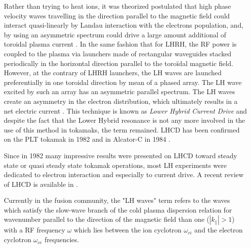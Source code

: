 Rather than trying to heat ions, it was theorized postulated that high phase velocity waves travelling in the direction parallel to the magnetic field could interact quasi-linearly by Landau interaction with the electrons population, and, by using an asymmetric spectrum could drive a large amount additional of toroidal plasma current . In the same fashion that for LHRH, the RF power is coupled to the plasma via launchers made of rectangular waveguides stacked periodically in the horizontal direction parallel to the toroïdal magnetic field. However, at the contrary of LHRH launchers, the LH waves are launched preferentially in one toroidal direction by mean of a phased array. The LH wave excited by such an array has an asymmetric parallel spectrum. The LH waves create an asymmetry in the electron distribution, which ultimately results in a net electric current . This technique is known as \emph{Lower Hybrid Current Drive} and despite the fact that the Lower Hybrid resonance is not any more involved in the use of this method in tokamaks, the term remained. LHCD has been confirmed on the PLT tokamak in 1982  and in Alcator-C in 1984 . 

Since in 1982 many impressive results were presented on LHCD toward steady state or quasi steady state tokamak operations, most LH experiments were dedicated to electron interaction and especially to current drive. A recent review of LHCD is available in .

Currently in the fusion community, the "LH waves" term refers to the waves which satisfy the slow-wave branch of the cold plasma dispersion relation for wavenumber parallel to the direction of the magnetic field than one ($|k_{\parallel}|>1$) with a RF frequency $\omega$ which lies between the ion cyclotron $\omega_{ci}$ and the electron cyclotron $\omega_{ce}$ frequencies. 



